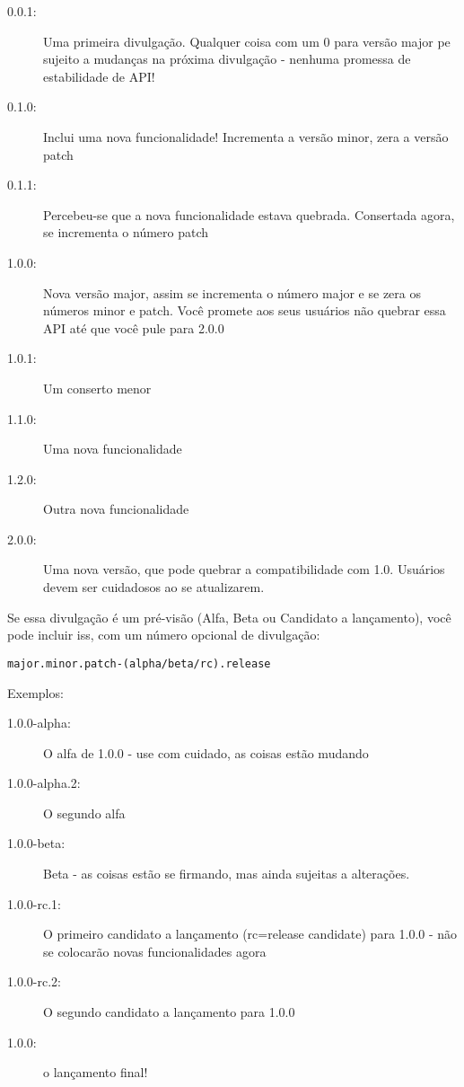 {\begin{description}
    \item [0.0.1:] Uma primeira divulgação. Qualquer coisa com um 0 para versão major pe sujeito a mudanças na próxima divulgação - nenhuma promessa de estabilidade de API!
    \item [0.1.0:] Inclui uma nova funcionalidade! Incrementa a versão minor, zera a versão patch
    \item [0.1.1:] Percebeu-se que a nova funcionalidade estava quebrada. Consertada agora, se incrementa o número patch
    \item [1.0.0:] Nova versão major, assim se incrementa o número major e se zera os números minor e patch. Você promete aos seus usuários não quebrar essa API até que você pule para 2.0.0
    \item [1.0.1:] Um conserto menor
    \item [1.1.0:] Uma nova funcionalidade
    \item [1.2.0:] Outra nova funcionalidade
    \item [2.0.0:] Uma nova versão, que pode quebrar a compatibilidade com 1.0. Usuários devem ser cuidadosos ao se atualizarem.
\end{description}


Se essa divulgação é um pré-visão (Alfa, Beta ou Candidato a lançamento), você pode incluir iss, com um número opcional de divulgação:

\begin{lstlisting}
major.minor.patch-(alpha/beta/rc).release
\end{lstlisting}

Exemplos:

\begin{description}
    \item[1.0.0-alpha:] O alfa de 1.0.0 - use com cuidado, as coisas estão mudando
    \item[1.0.0-alpha.2:] O segundo alfa
    \item[1.0.0-beta:] Beta - as coisas estão se firmando, mas ainda sujeitas a alterações.
    \item[1.0.0-rc.1:] O primeiro candidato a lançamento (rc=release candidate) para 1.0.0 - não se colocarão novas funcionalidades agora
    \item[1.0.0-rc.2:] O segundo candidato a lançamento para 1.0.0
    \item[1.0.0:] o lançamento final!
\end{description}

}
